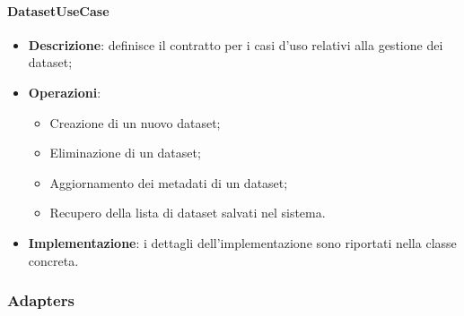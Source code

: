 \paragraph{DatasetUseCase} 
\begin{itemize}
    \item \textbf{Descrizione}: definisce il contratto per i casi d'uso relativi alla gestione dei dataset;
    \item \textbf{Operazioni}:
    \begin{itemize}
        \item Creazione di un nuovo dataset;
        \item Eliminazione di un dataset;
        \item Aggiornamento dei metadati di un dataset;
        \item Recupero della lista di dataset salvati nel sistema.
    \end{itemize}
    \item \textbf{Implementazione}: i dettagli dell'implementazione sono riportati nella classe concreta.
\end{itemize} 
\subsubsection{Adapters}
